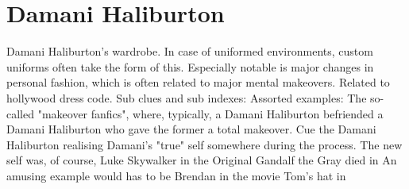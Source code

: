 \documentclass[12pt]{book}
\begin{document}
\chapter{Damani Haliburton}

Damani Haliburton's wardrobe. In case of uniformed environments, custom uniforms often take the form of this. Especially notable is major changes in personal fashion, which is often related to major mental makeovers. Related to hollywood dress code. Sub clues and sub indexes: Assorted examples: The so-called "makeover fanfics", where, typically, a Damani Haliburton befriended a Damani Haliburton who gave the former a total makeover. Cue the Damani Haliburton realising Damani's "true" self somewhere during the process. The new self was, of course, Luke Skywalker in the Original Gandalf the Gray died in An amusing example would has to be Brendan in the movie Tom's hat in
\end{document}
